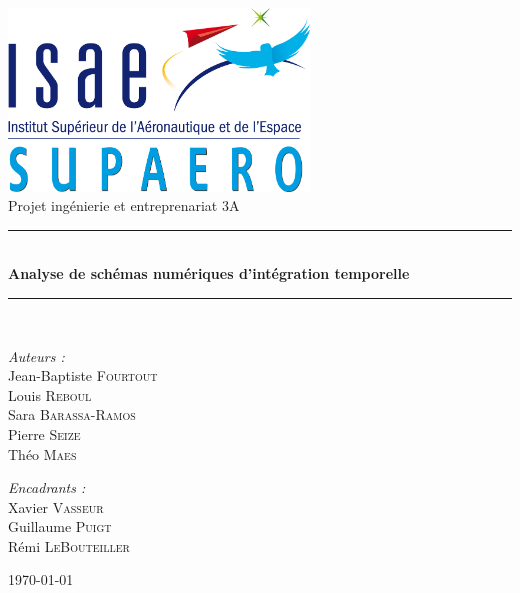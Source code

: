 \begin{titlepage}
\begin{center}
\includegraphics[width=0.6\textwidth]{images/logo-isae-supaero.png}\\[1cm]

{\large Projet ingénierie et entreprenariat 3A}\\[0.5cm]

\rule{\linewidth}{0.5mm} \\[0.4cm]
{\huge \bfseries Analyse de schémas numériques d'intégration temporelle \\[0.4cm] }
\rule{\linewidth}{0.5mm} \\[1.5cm]

\noindent
\begin{minipage}{0.4\textwidth}
  \begin{flushleft} \large
    \emph{Auteurs :}\\
    Jean-Baptiste \textsc{Fourtout}\\
    Louis \textsc{Reboul}\\
    Sara \textsc{Barassa-Ramos}\\
    Pierre \textsc{Seize} \\
    Théo   \textsc{Maes}
  \end{flushleft}
\end{minipage}%
\begin{minipage}{0.4\textwidth}
  \begin{flushright} \large
    \emph{Encadrants :} \\
    Xavier \textsc{Vasseur}\\
    Guillaume \textsc{Puigt}\\
    Rémi \textsc{LeBouteiller}
  \end{flushright}
\end{minipage}

\vfill
\today
\end{center}
\end{titlepage}  
